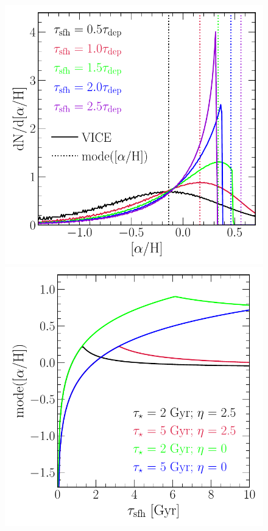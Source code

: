 \documentclass[12pt]{article}
\begin{document}
\begin{figure}
\centering
\includegraphics[scale = 0.55]{mode_oh.pdf}
\includegraphics[scale = 0.55]{mode_oh_versus_tausfh.pdf}

\end{figure}
\end{document}
